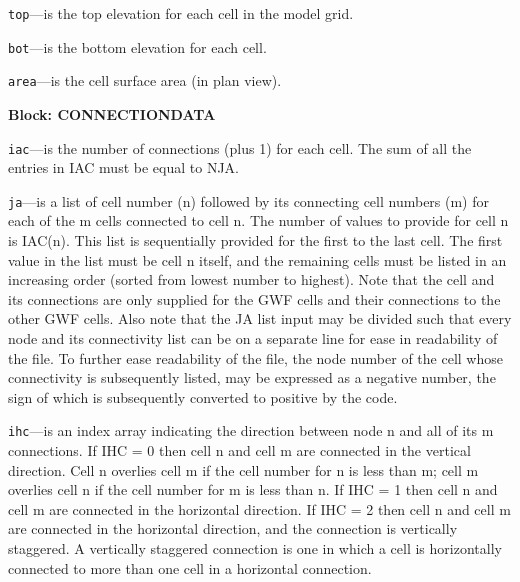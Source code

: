 \begin{description}
\item \texttt{top}---is the top elevation for each cell in the model grid.

\item \texttt{bot}---is the bottom elevation for each cell.

\item \texttt{area}---is the cell surface area (in plan view).

\end{description}
\item \textbf{Block: CONNECTIONDATA}

\begin{description}
\item \texttt{iac}---is the number of connections (plus 1) for each cell.  The sum of all the entries in IAC must be equal to NJA.

\item \texttt{ja}---is a list of cell number (n) followed by its connecting cell numbers (m) for each of the m cells connected to cell n. The number of values to provide for cell n is IAC(n).  This list is sequentially provided for the first to the last cell. The first value in the list must be cell n itself, and the remaining cells must be listed in an increasing order (sorted from lowest number to highest).  Note that the cell and its connections are only supplied for the GWF cells and their connections to the other GWF cells.  Also note that the JA list input may be divided such that every node and its connectivity list can be on a separate line for ease in readability of the file. To further ease readability of the file, the node number of the cell whose connectivity is subsequently listed, may be expressed as a negative number, the sign of which is subsequently converted to positive by the code.

\item \texttt{ihc}---is an index array indicating the direction between node n and all of its m connections.  If IHC = 0 then cell n and cell m are connected in the vertical direction.  Cell n overlies cell m if the cell number for n is less than m; cell m overlies cell n if the cell number for m is less than n.  If IHC = 1 then cell n and cell m are connected in the horizontal direction.  If IHC = 2 then cell n and cell m are connected in the horizontal direction, and the connection is vertically staggered.  A vertically staggered connection is one in which a cell is horizontally connected to more than one cell in a horizontal connection.


\end{description}
